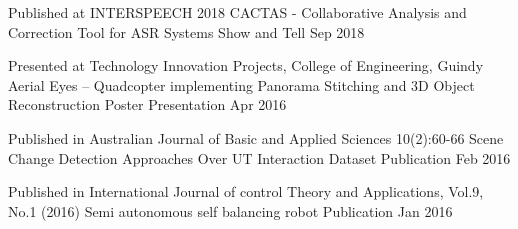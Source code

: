 

\begin{cventries}
   \cventry
    {Published at INTERSPEECH 2018} %
    {CACTAS - Collaborative Analysis and Correction Tool for ASR Systems} %
    {Show and Tell} %
    {Sep 2018} %
    {}

 \cventry
    {Presented at Technology Innovation Projects, College of Engineering, Guindy} %
    {Aerial Eyes – Quadcopter implementing Panorama Stitching and 3D Object Reconstruction} %
    {Poster Presentation} %
    {Apr 2016} %
    {}


      \vspace{-1mm}
  \cventry
    {Published in Australian Journal of Basic and Applied Sciences 10(2):60-66} %
    {Scene Change Detection Approaches Over UT Interaction Dataset} %
    {Publication}
    {Feb 2016} %
    {}

      \vspace{-1mm}
  \cventry
    {Published in International Journal of control Theory and Applications, Vol.9, No.1 (2016)} %
    {Semi autonomous self balancing robot} %
    {Publication} %
    {Jan 2016} %
    {}

\end{cventries}
